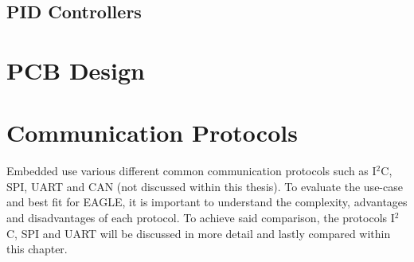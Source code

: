 \documentclass[fontsize=11pt,%
twoside,%
BCOR          = 8mm, %
DIV           = 11,  %
titlepage     = off,%
index=totoc,%
xcolor        = pdftex,%
dvipsnames,%
bibliography  = totoc,%
bibliography = numbered, %
listof        = notnumbered]{scrreprt}
\begin{document}
\subsection{PID Controllers}

\section{PCB Design}

\section{Communication Protocols}
Embedded use various different common communication protocols such as I$^2$C, SPI, UART and CAN (not discussed within this thesis). To evaluate the use-case and best fit for EAGLE, it is important to understand the complexity, advantages and disadvantages of each protocol. To achieve said comparison, the protocols I$^2$C, SPI and UART will be discussed in more detail and lastly compared within this chapter.
\end{document}
